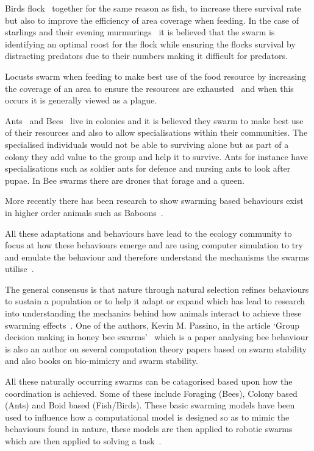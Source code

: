 Birds flock~\cite{PMRT:14} together for the same reason as fish, to increase there survival rate but also to improve the efficiency of area coverage when feeding. In the case of starlings and their evening murmurings~\cite{YSCGL:12} it is believed that the swarm is identifying an optimal roost for the flock while ensuring the flocks survival by distracting predators due to their numbers making it difficult for predators.

Locusts swarm when feeding to make best use of the food resource by increasing the coverage of an area to ensure the resources are exhausted~\cite{GSSC:12, TDEB:12} and when this occurs it is generally viewed as a plague.

Ants~\cite{MK:15} and Bees~\cite{SVP:06} live in colonies and it is believed they swarm to make best use of their resources and also to allow specialisations within their communities. The specialised individuals would not be able to surviving alone but as part of a colony they add value to the group and help it to survive. Ants for instance have specialisations such as soldier ants for defence and nursing ants to look after pupae. In Bee swarms there are drones that forage and a queen.

More recently there has been research to show swarming based behaviours exist in higher order animals such as Baboons~\cite{SFDCIC:15}.

All these adaptations and behaviours have lead to the ecology community to focus at how these behaviours emerge and are using computer simulation to try and emulate the behaviour and therefore understand the mechanisms the swarms utilise~\cite{ENNT:10}.

The general consensus is that nature through natural selection refines behaviours to sustain a population or to help it adapt or expand which has lead to research into understanding the mechanics behind how animals interact to achieve these swarming effects~\cite{ENNT:10, RO:15, TDEB:12}. One of the authors, Kevin M. Passino, in the article `Group decision making in honey bee swarms'~\cite{SVP:06} which is a paper analysing bee behaviour is also an author on several computation theory papers based on swarm stability~\cite{GP:04, GP:02, GP:04a} and also books on bio-mimicry and swarm stability. 

All these naturally occurring swarms can be catagorised based upon how the coordination is achieved. Some of these include Foraging (Bees), Colony based (Ants) and Boid based (Fish/Birds). These basic swarming models have been used to influence how a computational model is designed so as to mimic the behaviours found in nature, these models are then applied to robotic swarms which are then applied to solving a task~\cite{LG:14}.

